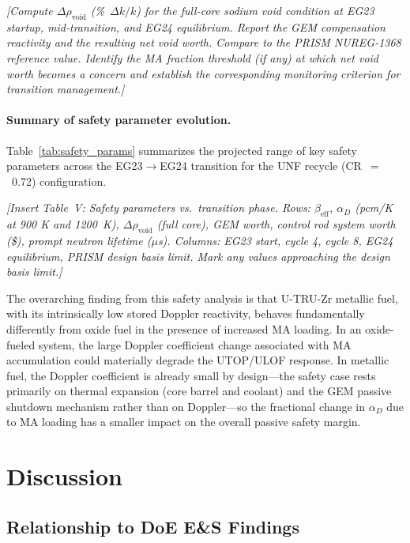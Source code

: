 \documentclass[10pt,twoside]{article}
\newcommand{\placeholder}[1]{%
  \textcolor{placeholder}{\textit{[#1]}}}
\begin{document}
\placeholder{Compute $\Delta\rho_\text{void}$ (\%~$\Delta k/k$)
  for the full-core sodium void condition at EG23 startup,
  mid-transition, and EG24 equilibrium.  Report the GEM
  compensation reactivity and the resulting net void worth.
  Compare to the PRISM NUREG-1368 reference value.  Identify
  the MA fraction threshold (if any) at which net void worth
  becomes a concern and establish the corresponding monitoring
  criterion for transition management.}

\paragraph{Summary of safety parameter evolution.}
Table~\ref{tab:safety_params} summarizes the projected range of
key safety parameters across the EG23$\rightarrow$EG24 transition
for the UNF recycle (CR~$=$~0.72) configuration.

\placeholder{Insert Table~V: Safety parameters vs.\ transition
  phase.  Rows: $\beta_\text{eff}$, $\alpha_D$ (pcm/K at 900 K
  and 1200~K), $\Delta\rho_\text{void}$ (full core), GEM worth,
  control rod system worth (\$), prompt neutron lifetime ($\mu$s).
  Columns: EG23 start, cycle 4, cycle 8, EG24 equilibrium,
  PRISM design basis limit.  Mark any values approaching the
  design basis limit.}
\label{tab:safety_params}

The overarching finding from this safety analysis is that
U-TRU-Zr metallic fuel, with its intrinsically low stored
Doppler reactivity, behaves fundamentally differently from
oxide fuel in the presence of increased MA loading.  In an
oxide-fueled system, the large Doppler coefficient change
associated with MA accumulation could materially degrade the
UTOP/ULOF response.  In metallic fuel, the Doppler coefficient
is already small by design---the safety case rests primarily
on thermal expansion (core barrel and coolant) and the GEM
passive shutdown mechanism rather than on Doppler---so the
fractional change in $\alpha_D$ due to MA loading has a
smaller impact on the overall passive safety margin.\cite{Till2011}

\section{Discussion}

\subsection{Relationship to DoE E\&S Findings}
\end{document}
